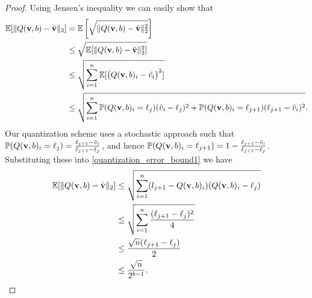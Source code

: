 \documentclass{article}
\newtheorem{corollary}{Corollary}
\begin{document}
\begin{proof}
Using Jensen's inequality we can easily show that
\begin{equation}\label{quantization_error_bound1}
\begin{split}
    \mathbb{E}[\| Q({\bf v}, b) - \hat{\bf v}\|_2] &= \mathbb{E}\left[\sqrt{\| Q({\bf v}, b) - \hat{\bf v}\|^2_2} \right]\\
    &\leq \sqrt{\mathbb{E}[\| Q({\bf v}, b) - \hat{\bf v}\|^2_2]}\\
    &\leq \sqrt{\sum_{i=1}^{n} \mathbb{E}[\big (Q({\bf v}, b)_i -\hat{v_i}\big)^2]}\\
    &\leq \sqrt{\sum_{i=1}^{n} \mathbb{P}(Q({\bf v}, b)_i = \ell_j)(\hat{v}_i-\ell_j)^2 + \mathbb{P}(Q({\bf v}, b)_i = \ell_{j+1})(\ell_{j+1}-\hat{v}_i)^2}.
\end{split}
\end{equation}
Our quantization scheme uses a stochastic approach such that $\mathbb{P}(Q({\bf v}, b)_i = \ell_j)=\frac{\ell_{j+1}-\hat{v}_i}{\ell_{j+1}-\ell_{j}}$, and hence $\mathbb{P}(Q({\bf v}, b)_i = \ell_{j+1})=1-\frac{\ell_{j+1}-\hat{v}_i}{\ell_{j+1}-\ell_{j}}$. Substituting these into \ref{quantization_error_bound1} we have
\begin{equation}\label{quantization_error}
\begin{split}
    \mathbb{E}[\| Q({\bf v}, b) - \hat{\bf v}\|_2] &\leq \sqrt{\sum_{i=1}^{n} (l_{j+1}-Q({\bf v}, b)_i)(Q({\bf v}, b)_i-\ell_j)}\\
    &\leq \sqrt{\sum_{i=1}^{n} \frac{(\ell_{j+1}-\ell_j)^2}{4}}\\
    &\leq \frac{\sqrt{n}(\ell_{j+1}-\ell_j)}{2}\\
    &\leq \frac{\sqrt{n}}{2^{b-1}}.
\end{split}
\end{equation}
\end{proof}
\end{document}
